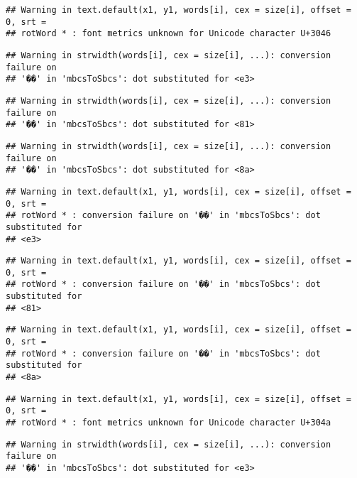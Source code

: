 \documentclass[]{article}
\begin{document}
\begin{verbatim}
## Warning in text.default(x1, y1, words[i], cex = size[i], offset = 0, srt =
## rotWord * : font metrics unknown for Unicode character U+3046
\end{verbatim}

\begin{verbatim}
## Warning in strwidth(words[i], cex = size[i], ...): conversion failure on
## '��' in 'mbcsToSbcs': dot substituted for <e3>
\end{verbatim}

\begin{verbatim}
## Warning in strwidth(words[i], cex = size[i], ...): conversion failure on
## '��' in 'mbcsToSbcs': dot substituted for <81>
\end{verbatim}

\begin{verbatim}
## Warning in strwidth(words[i], cex = size[i], ...): conversion failure on
## '��' in 'mbcsToSbcs': dot substituted for <8a>
\end{verbatim}

\begin{verbatim}
## Warning in text.default(x1, y1, words[i], cex = size[i], offset = 0, srt =
## rotWord * : conversion failure on '��' in 'mbcsToSbcs': dot substituted for
## <e3>
\end{verbatim}

\begin{verbatim}
## Warning in text.default(x1, y1, words[i], cex = size[i], offset = 0, srt =
## rotWord * : conversion failure on '��' in 'mbcsToSbcs': dot substituted for
## <81>
\end{verbatim}

\begin{verbatim}
## Warning in text.default(x1, y1, words[i], cex = size[i], offset = 0, srt =
## rotWord * : conversion failure on '��' in 'mbcsToSbcs': dot substituted for
## <8a>
\end{verbatim}

\begin{verbatim}
## Warning in text.default(x1, y1, words[i], cex = size[i], offset = 0, srt =
## rotWord * : font metrics unknown for Unicode character U+304a
\end{verbatim}

\begin{verbatim}
## Warning in strwidth(words[i], cex = size[i], ...): conversion failure on
## '��' in 'mbcsToSbcs': dot substituted for <e3>
\end{verbatim}
\end{document}
